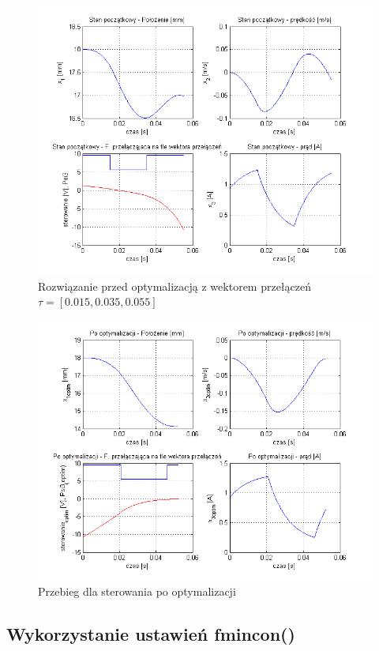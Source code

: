 \begin{figure}[!htb]
\centering
\includegraphics[scale=1]{img/start2.png}
\caption{Rozwiązanie przed optymalizacją z wektorem przełączeń $\tau = [0.015, 0.035, 0.055]$}
\label{rys:start1}
\end{figure}


\begin{figure}[!htb]
\centering
\includegraphics[scale=1]{img/optim2.png}
\caption{Przebieg dla sterowania po optymalizacji}
\label{rys:start1}
\end{figure}

\newpage
\subsection{Wykorzystanie ustawień fmincon()}

